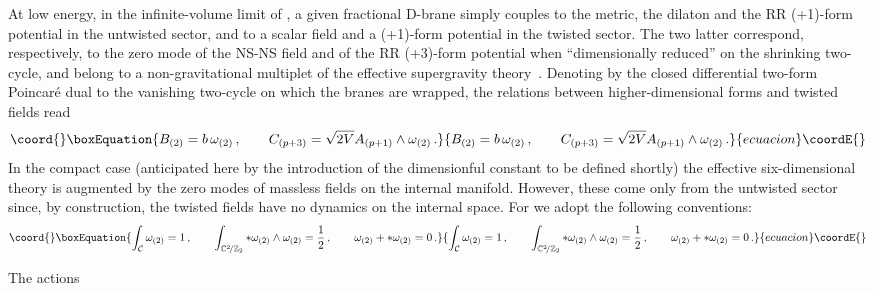 \documentclass[a4paper,11pt]{article}
\makeatletter
\renewcommand{\subsection}{\@startsection{subsection}{2}{\z@} {-3.25ex
plus -1ex minus -.2ex}{1.5ex plus .2ex}{\normalsize\bf}}
\providecommand{\ZZ}{\mathbb{Z}}  \providecommand{\Zint}{\mathbb{Z}}
\makeatother
\begin{document}
At low energy, in the infinite-volume limit of \myHighlight{$T^4\!/\ZZ_2$}\coordHE{}, a given
fractional D\coordHE{}-brane simply couples to the metric, the dilaton and
the RR (\coordHE{}+1)-form potential in the untwisted sector, and to a scalar
field and a (\coordHE{}+1)-form potential in the twisted sector. The two latter
correspond, respectively, to the zero mode of the NS-NS \coordHE{} field
and of the RR (\coordHE{}+3)-form potential when ``dimensionally reduced'' on
the shrinking two-cycle, and belong to a non-gravitational multiplet of
the effective supergravity theory~\cite{Diaconescu:1998br,Billo:2000yb}.
Denoting by \coordHE{} the closed differential two-form Poincar\'e
dual to the vanishing two-cycle \coordHE{} on which the branes are
wrapped, the relations between higher-dimensional forms and twisted
fields read
\begin{equation}\coord{}\boxEquation{
\label{twistedfields}
B_{(2)} = b \, \omega_{(2)} \spa C_{(p+3)}= \sqrt{2V} A_{(p+1)} \wedge
\omega_{(2)} \,.
}{
B_{(2)} = b \, \omega_{(2)} \spa C_{(p+3)}= \sqrt{2V} A_{(p+1)} \wedge
\omega_{(2)} \,.
}{ecuacion}\coordE{}\end{equation}
In the compact case (anticipated here by the introduction of the
dimensionful constant \coordHE{} to be defined shortly) the effective
six-dimensional theory is augmented by the zero modes of massless
fields on the internal manifold. However, these come only from the
untwisted sector since, by construction, the twisted fields have no
dynamics on the internal space. For \coordHE{} we adopt the
following conventions:
\begin{equation}\coord{}\boxEquation{
\label{omegaconv}
\int_{\mathcal{C}} \omega_{(2)} = 1 \spa \int_{\IC^2\!/\ZZ_2}
{*}\omega_{(2)}\wedge\omega_{(2)} = \frac{1}{2} \spa
\omega_{(2)}+{*}\omega_{(2)} = 0 \,.
}{
\int_{\mathcal{C}} \omega_{(2)} = 1 \spa \int_{\IC^2\!/\ZZ_2}
{*}\omega_{(2)}\wedge\omega_{(2)} = \frac{1}{2} \spa
\omega_{(2)}+{*}\omega_{(2)} = 0 \,.
}{ecuacion}\coordE{}\end{equation}


\subsection{The actions}
\label{subsect:lagrangian}
\end{document}
